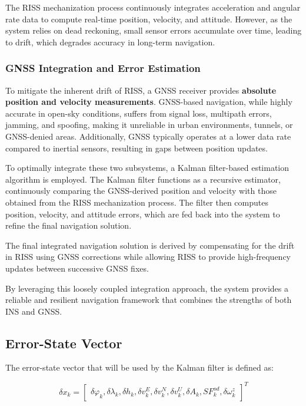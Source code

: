\documentclass[conference]{IEEEtran}
\begin{document}
The RISS mechanization process continuously integrates acceleration and angular rate data to compute real-time position, velocity, and attitude. However, as the system relies on dead reckoning, small sensor errors accumulate over time, leading to drift, which degrades accuracy in long-term navigation.

\subsubsection{GNSS Integration and Error Estimation}
To mitigate the inherent drift of RISS, a GNSS receiver provides \textbf{absolute position and velocity measurements}. GNSS-based navigation, while highly accurate in open-sky conditions, suffers from signal loss, multipath errors, jamming, and spoofing, making it unreliable in urban environments, tunnels, or GNSS-denied areas. Additionally, GNSS typically operates at a lower data rate compared to inertial sensors, resulting in gaps between position updates.

To optimally integrate these two subsystems, a Kalman filter-based estimation algorithm is employed. The Kalman filter functions as a recursive estimator, continuously comparing the GNSS-derived position and velocity with those obtained from the RISS mechanization process. The filter then computes position, velocity, and attitude errors, which are fed back into the system to refine the final navigation solution.

The final integrated navigation solution is derived by compensating for the drift in RISS using GNSS corrections while allowing RISS to provide high-frequency updates between successive GNSS fixes. 

By leveraging this loosely coupled integration approach, the system provides a reliable and resilient navigation framework that combines the strengths of both INS and GNSS.

\subsection{Error-State Vector}

The error-state vector that will be used by the Kalman filter is defined as:

\begin{equation}
\delta x_k = \begin{bmatrix} 
\delta \varphi_k, \delta \lambda_k, \delta h_k, \delta v_k^E, \delta v_k^N, \delta v_k^U, \delta A_k, SF_k^{od}, \delta \omega_k^z
\end{bmatrix}^T
\end{equation}
\end{document}
